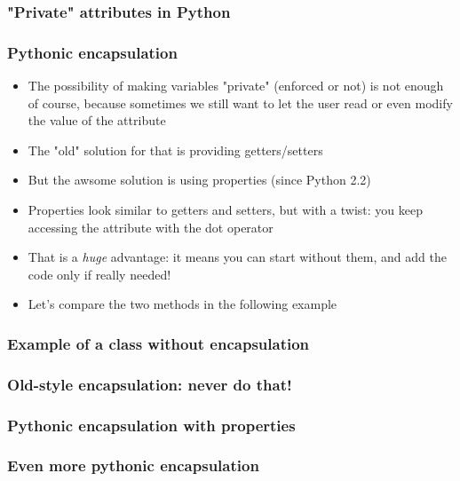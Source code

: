 \documentclass[9pt]{beamer}
\begin{document}
\begin{frame}
  \frametitle{"Private" attributes in Python}
  
\end{frame}


\begin{frame}
  \frametitle{Pythonic encapsulation}
  
  \begin{itemize}
    \small
    \item The possibility of making variables "private" (enforced or not) is not enough of course,
          because sometimes we still want to let the user read or even modify the value of the attribute
    \bigskip
    \item The "old" solution for that is providing getters/setters
    \bigskip
    \item But the awsome solution is using \alert{properties} (since Python 2.2)
    \bigskip
    \item Properties look similar to getters and setters, but with a twist: you keep
          accessing the attribute with the dot operator
    \bigskip
    \item That is a \emph{huge} advantage: it means you can start without them, and add the code only if really needed!
    \bigskip
    \item Let's compare the two methods in the following example
  \end{itemize}
  
\end{frame}


\begin{frame}
  \frametitle{Example of a class without encapsulation}
  
\end{frame}


\begin{frame}
  \frametitle{Old-style encapsulation: never do that!}
  
\end{frame}



\begin{frame}
  \frametitle{Pythonic encapsulation with properties}
  
\end{frame}


\begin{frame}
  \frametitle{Even more pythonic encapsulation}
  
\end{frame}
\end{document}
